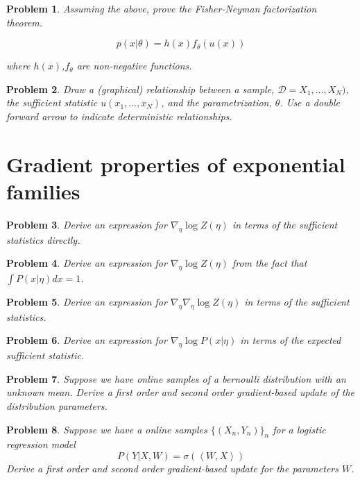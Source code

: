 \documentclass[a4paper]{article}
\newtheorem{problem}{Problem}[section]
\begin{document}
\begin{problem}
Assuming the above, prove the Fisher-Neyman factorization theorem.

\begin{equation}
  p(x \vert \theta) = h(x) f_\theta( u(x) )
  \label{Fisher-Neyman factorization theorem}
\end{equation}

where $h(x)$,$f_\theta$ are non-negative functions.
\end{problem}

\begin{problem}
Draw a (graphical) relationship between a sample, $\mathcal{D} = X_1,\ldots,X_N)$, the sufficient statistic $u(x_1, \ldots, x_N)$, and the parametrization, $\theta$. 
Use a double forward arrow to indicate deterministic relationships.
\end{problem}


\section{Gradient properties of exponential families}


\begin{problem}
Derive an expression for $ \nabla_\eta \log Z(\eta) $ in terms of the sufficient statistics directly.
\end{problem}

\begin{problem}
Derive an expression for $ \nabla_\eta \log Z(\eta) $ from the fact that $ \int P( x \vert \eta) dx = 1 $.
\end{problem}

\begin{problem}
Derive an expression for $ \nabla_\eta \nabla_\eta \log Z(\eta) $ in terms of the sufficient statistics.
\end{problem}

\begin{problem}
Derive an expression for $ \nabla_\eta \log P( x \vert \eta ) $ in terms of the expected sufficient statistic.
\end{problem}

\begin{problem}
  Suppose we have online samples of a bernoulli distribution with an unknown mean.  Derive a first order and second order gradient-based update of the distribution parameters.
\end{problem}

\begin{problem}
  Suppose we have a online samples $\{(X_n,Y_n)\}_n$ for a logistic regression model
  \begin{equation}
    P( Y \vert X, W) = \sigma( \left< W, X \right> )
    \label{logistic}
  \end{equation}
  Derive a first order and second order gradient-based update for the parameters $W$.
\end{problem}
\end{document}
